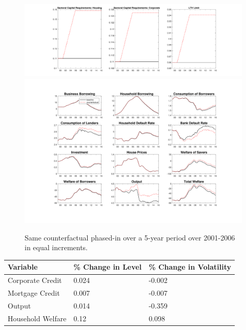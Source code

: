 \documentclass[12pt]{article}
\numberwithin{equation}{section}
\begin{document}
\begin{figure}[H]
\centering
\caption{Same counterfactual phased-in over a 5-year period over 2001-2006 in equal increments.}
\includegraphics[scale=0.35]{CF_policy_rules10.pdf}
\includegraphics[scale=0.45]{counterfactuals10.pdf}\\

\end{figure}


\begin{table}[h]

\begin{tabular}{l|l|l}
\small
Variable & \% Change in Level & \% Change in Volatility \\
\hline
\hline
    Corporate Credit           &       0.024   &      -0.002 \\
    Mortgage Credit            &      0.007    &       -0.007 \\
    Output         				&     0.014    &    -0.359 \\ 
    Household Welfare       &     0.12     &     0.098\\
\end{tabular}
\end{table}
\end{document}
